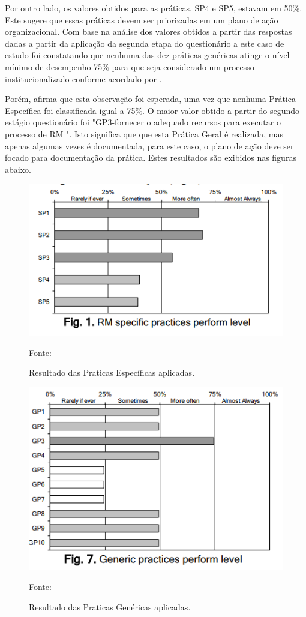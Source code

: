 Por outro lado, os valores obtidos para
as práticas, SP4 e SP5, estavam em 50\%. Este
sugere que essas práticas devem ser priorizadas em
um plano de ação organizacional. Com base na análise dos valores obtidos a partir das
respostas dadas a partir da aplicação da segunda etapa do questionário a este caso de estudo foi constatando que nenhuma das dez práticas genéricas atinge o nível mínimo de desempenho 75\% para que seja considerado um
processo institucionalizado conforme acordado por \cite{cuevas2004assessment}. 

Porém, \cite{cuevas2004assessment} afirma que esta observação foi
esperada, uma vez que nenhuma Prática Específica foi classificada igual a 75\%.
O maior valor obtido a partir do segundo estágio
questionário foi "GP3-fornecer o adequado
recursos para executar o processo de RM ". Isto significa que
que esta Prática Geral é realizada, mas apenas algumas vezes é documentada, para este caso, o plano de ação deve ser focado para documentação da prática.
Estes resultados são exibidos nas figuras abaixo.

\newpage
\begin{figure}[!htb]
\centering
\label{fig01}
\includegraphics[keepaspectratio=true,scale=0.6]{figuras/resulto_status_praticas_especificas.png}
\caption{Resultado das Praticas Específicas aplicadas.}
{Fonte: \cite{cuevas2004assessment}}
\end{figure}
\begin{figure}[!htb]
\centering
\label{fig01}
\includegraphics[keepaspectratio=true,scale=0.6]{figuras/resultados_praticas_gerais.png}
\caption{Resultado das Praticas Genéricas aplicadas.}
{Fonte: \cite{cuevas2004assessment}}
\end{figure}
\newpage


